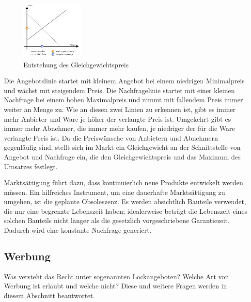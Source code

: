 \begin{figure}
	\begin{center}
		\includegraphics[width=0.28\textwidth]{1jahr_pictures/lf01-pic/lf01-gleichgewichtspreis.png}
	\end{center}
	\caption{Entstehung des Gleichgewichtspreis}
\end{figure}

Die Angebotslinie startet mit kleinem Angebot bei einem niedrigen Minimalpreis und wächst mit steigendem Preis. Die Nachfragelinie startet mit einer kleinen Nachfrage bei einem hohen Maximalpreis und nimmt mit fallendem Preis immer weiter an Menge zu. Wie an diesen zwei Linien zu erkennen ist, gibt es immer mehr Anbieter und Ware je höher der verlangte Preis ist. Umgekehrt gibt es immer mehr Abnehmer, die immer mehr kaufen, je niedriger der für die Ware verlangte Preis ist. Da die Preiswünsche von Anbietern und Abnehmern gegenläufig sind, stellt sich im Markt ein Gleichgewicht an der Schnittstelle von Angebot und Nachfrage ein, die den Gleichgewichtspreis und das Maximum des Umsatzes festlegt.

Marktsättigung führt dazu, dass kontinuierlich neue Produkte entwickelt werden müssen. Ein hilfreiches Instrument, um eine dauerhafte Marktsättigung zu umgehen, ist die geplante Obsoleszenz. Es werden absichtlich Bauteile verwendet, die nur eine begrenzte Lebenszeit haben; idealerweise beträgt die Lebenszeit eines solchen Bauteils nicht länger als die gesetzlich vorgeschriebene Garantiezeit. Dadurch wird eine konstante Nachfrage generiert.


\subsection{Werbung}

Was versteht das Recht unter sogenannten \ql Lockangeboten\qr? Welche Art von Werbung ist erlaubt und welche nicht? Diese und weitere Fragen werden in diesem Abschnitt beantwortet. 

